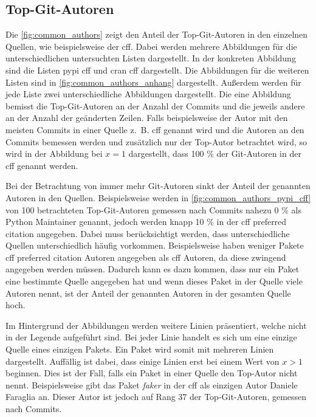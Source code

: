 \subsection*{Top-Git-Autoren}
Die \autoref{fig:common_authors} zeigt den Anteil der Top-Git-Autoren in den einzelnen Quellen, wie beispielsweise der \gls{cff}.
Dabei werden mehrere Abbildungen für die unterschiedlichen untersuchten Listen dargestellt.
In der konkreten Abbildung sind die Listen \gls{pypi} \gls{cff} und \gls{cran} \gls{cff} dargestellt.
Die Abbildungen für die weiteren Listen sind in \autoref{fig:common_authors_anhang} dargestellt.
Außerdem werden für jede Liste zwei unterschiedliche Abbildungen dargestellt.
Die eine Abbildung bemisst die Top-Git-Autoren an der Anzahl der Commits und die jeweils andere an der Anzahl der geänderten Zeilen.
Falls beispielsweise der Autor mit den meisten Commits in einer Quelle z.~B. \gls{cff} genannt wird und die Autoren an den Commits bemessen werden und zusätzlich nur der Top-Autor betrachtet wird, so wird in der Abbildung bei $x=1$ dargestellt, dass 100 \% der Git-Autoren in der \gls{cff} genannt werden.

Bei der Betrachtung von immer mehr Git-Autoren sinkt der Anteil der genannten Autoren in den Quellen.
Beispielsweise werden in \autoref{fig:common_authors_pypi_cff} von 100 betrachteten Top-Git-Autoren gemessen nach Commits nahezu 0 \% als Python Maintainer genannt, jedoch werden knapp 10 \% in der \gls{cff} preferred citation angegeben.
Dabei muss berücksichtigt werden, dass unterschiedliche Quellen unterschiedlich häufig vorkommen.
Beispielsweise haben weniger Pakete \gls{cff} preferred citation Autoren angegeben als \gls{cff} Autoren, da diese zwingend angegeben werden müssen.
Dadurch kann es dazu kommen, dass nur ein Paket eine bestimmte Quelle angegeben hat und wenn dieses Paket in der Quelle viele Autoren nennt, ist der Anteil der genannten Autoren in der gesamten Quelle hoch.

Im Hintergrund der Abbildungen werden weitere Linien präsentiert, welche nicht in der Legende aufgeführt sind.
Bei jeder Linie handelt es sich um eine einzige Quelle eines einzigen Pakets.
Ein Paket wird somit mit mehreren Linien dargestellt.
Auffällig ist dabei, dass einige Linien erst bei einem Wert von $x>1$ beginnen.
Dies ist der Fall, falls ein Paket in einer Quelle den Top-Autor nicht nennt.
Beispielsweise gibt das Paket \emph{faker} in der \gls{cff} als einzigen Autor \glqq Daniele Faraglia\grqq{} an.
Dieser Autor ist jedoch auf Rang 37 der Top-Git-Autoren, gemessen nach Commits.

